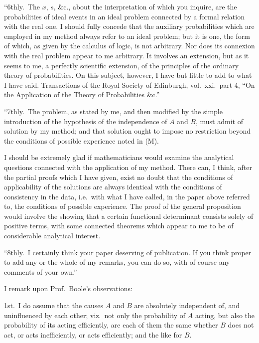 \documentclass[11pt,a4paper]{article}
\theoremstyle{plain}
\begin{document}
``6thly.\ The $x$, $s$, \&c., about the interpretation of which you inquire, are the probabilities of ideal events in an ideal problem connected by a formal relation with the real one. I should fully concede that the auxiliary probabilities which are employed in my method always refer to an ideal problem; but it is one, the form of which, as given by the calculus of logic, is not arbitrary. Nor does its connexion with the real problem appear to me arbitrary. It involves an extension, but as it seems to me, a perfectly scientific extension, of the principles of the ordinary theory of probabilities. On this subject, however, I have but little to add to what I have said. Transactions of the Royal Society of Edinburgh, vol.\ xxi.\ part 4, ``On the Application of the Theory of Probabilities \&c.''

``7thly.\ The problem, as stated by me, and then modified by the simple introduction of the hypothesis of the independence of $A$ and $B$, must admit of solution by my method; and that solution ought to impose no restriction beyond the conditions of possible experience noted in (M).

I should be extremely glad if mathematicians would examine the analytical questions connected with the application of my method. There can, I think, after the partial proofs which I have given, exist no doubt that the conditions of applicability of the solutions are always identical with the conditions of consistency in the data, i.e.\ with what I have called, in the paper above referred to, the conditions of possible experience. The proof of the general proposition would involve the showing that a certain functional determinant consists solely of positive terms, with some connected theorems which appear to me to be of considerable analytical interest.

``8thly.\ I certainly think your paper deserving of publication. If you think proper to add any or the whole of my remarks, you can do so, with of course any comments of your own.''

\medskip

I remark upon Prof.\ Boole's observations:

\medskip

1st.\ I do assume that the causes $A$ and $B$ are absolutely independent of, and uninfluenced by each other; viz.\ not only the probability of $A$ acting, but also the probability of its acting efficiently, are each of them the same whether $B$ does not act, or acts inefficiently, or acts efficiently; and the like for $B$.
\end{document}
